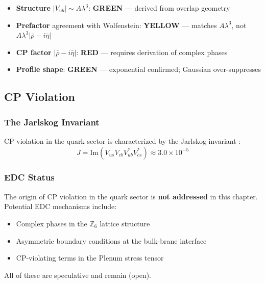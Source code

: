 \begin{tcolorbox}[colback=green!10, colframe=green!50!black,
    title=\textbf{Attempt 2.2 Summary: Structure GREEN, Prefactor YELLOW}]
\begin{itemize}[nosep]
    \item \textbf{Structure} $|V_{ub}| \sim A\lambda^3$: \textcolor{OliveGreen}{\textbf{GREEN}} \tagDc{}
          --- derived from overlap geometry
    \item \textbf{Prefactor} agreement with Wolfenstein: \textcolor{YellowOrange}{\textbf{YELLOW}} \tagI{}
          --- matches $A\lambda^3$, not $A\lambda^3|\bar\rho{-}i\bar\eta|$
    \item \textbf{CP factor} $|\bar\rho{-}i\bar\eta|$: \textcolor{BrickRed}{\textbf{RED}}
          --- requires derivation of complex phases
    \item \textbf{Profile shape}: \textcolor{OliveGreen}{\textbf{GREEN}} \tagDc{}
          --- exponential confirmed; Gaussian over-suppresses
\end{itemize}
\end{tcolorbox}

\subsection{CP Violation}
\label{sec:ch7_cp}

\subsubsection{The Jarlskog Invariant}

CP violation in the quark sector is characterized by the Jarlskog invariant
\tagBL{}:
\begin{equation}
    J = \text{Im}(V_{us} V_{cb} V_{ub}^* V_{cs}^*) \approx 3.0 \times 10^{-5}
    \label{eq:ch7_jarlskog}
\end{equation}

\subsubsection{EDC Status}

\begin{tcolorbox}[colback=gray!5, colframe=gray!50!black,
    title=\textbf{CP Violation: Not Addressed}]
The origin of CP violation in the quark sector is \textbf{not addressed}
in this chapter. Potential EDC mechanisms include:
\begin{itemize}[nosep]
    \item Complex phases in the $\mathbb{Z}_6$ lattice structure
    \item Asymmetric boundary conditions at the bulk-brane interface
    \item CP-violating terms in the Plenum stress tensor
\end{itemize}
All of these are speculative and remain (open).
\end{tcolorbox}

